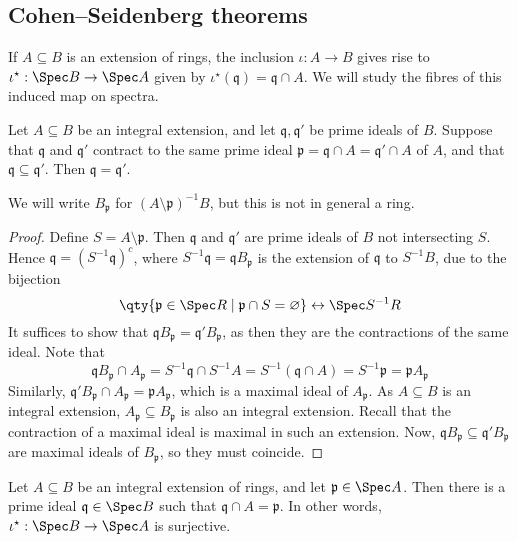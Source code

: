 \subsection{Cohen--Seidenberg theorems}
If \( A \subseteq B \) is an extension of rings, the inclusion \( \iota : A \to B \) gives rise to \( \iota^\star : \Spec B \to \Spec A \) given by \( \iota^\star(\mathfrak q) = \mathfrak q \cap A \).
We will study the fibres of this induced map on spectra.
\begin{proposition}[incomparability]
    Let \( A \subseteq B \) be an integral extension, and let \( \mathfrak q, \mathfrak q' \) be prime ideals of \( B \).
    Suppose that \( \mathfrak q \) and \( \mathfrak q' \) contract to the same prime ideal \( \mathfrak p = \mathfrak q \cap A = \mathfrak q' \cap A \) of \( A \), and that \( \mathfrak q \subseteq \mathfrak q' \).
    Then \( \mathfrak q = \mathfrak q' \).
\end{proposition}
We will write \( B_{\mathfrak p} \) for \( (A \setminus \mathfrak p)^{-1} B \), but this is not in general a ring.
\begin{proof}
    Define \( S = A \setminus \mathfrak p \).
    Then \( \mathfrak q \) and \( \mathfrak q' \) are prime ideals of \( B \) not intersecting \( S \).
    Hence \( \mathfrak q = (S^{-1} \mathfrak q)^c \), where \( S^{-1} \mathfrak q = \mathfrak q B_{\mathfrak p} \) is the extension of \( \mathfrak q \) to \( S^{-1} B \), due to the bijection
    \[ \qty{\mathfrak p \in \Spec R \mid \mathfrak p \cap S = \varnothing} \leftrightarrow \Spec S^{-1}R \]
    It suffices to show that \( \mathfrak q B_{\mathfrak p} = \mathfrak q' B_{\mathfrak p} \), as then they are the contractions of the same ideal.
    Note that
    \[ \mathfrak q B_{\mathfrak p} \cap A_{\mathfrak p} = S^{-1} \mathfrak q \cap S^{-1} A = S^{-1} (\mathfrak q \cap A) = S^{-1} \mathfrak p = \mathfrak p A_{\mathfrak p} \]
    Similarly, \( \mathfrak q' B_{\mathfrak p} \cap A_{\mathfrak p} = \mathfrak p A_{\mathfrak p} \), which is a maximal ideal of \( A_{\mathfrak p} \).
    As \( A \subseteq B \) is an integral extension, \( A_{\mathfrak p} \subseteq B_{\mathfrak p} \) is also an integral extension.
    Recall that the contraction of a maximal ideal is maximal in such an extension.
    Now, \( \mathfrak q B_{\mathfrak p} \subseteq \mathfrak q' B_{\mathfrak p} \) are maximal ideals of \( B_{\mathfrak p} \), so they must coincide.
\end{proof}
\begin{proposition}
    Let \( A \subseteq B \) be an integral extension of rings, and let \( \mathfrak p \in \Spec A \).
    Then there is a prime ideal \( \mathfrak q \in \Spec B \) such that \( \mathfrak q \cap A = \mathfrak p \).
    In other words, \( \iota^\star : \Spec B \to \Spec A \) is surjective.
\end{proposition}

